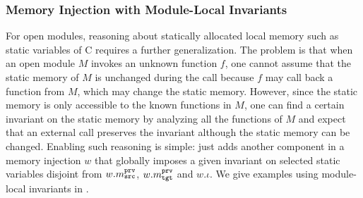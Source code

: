 {





\subsubsection{Memory Injection with Module-Local Invariants}
\label{sec:overview-verification:injection:static}
%
For open modules, reasoning about statically allocated local memory
such as static variables of C requires a further generalization.  The
problem is that when an open module $M$ invokes an unknown function
$f$, one cannot assume that the static memory of $M$ is unchanged
during the call because $f$ may call back a function from $M$, which
may change the static memory. However, since the static memory is only
accessible to the known functions in $M$, one can find a certain
invariant on the static memory by analyzing all the functions of $M$
and expect that an external call preserves the invariant although the
static memory can be changed. Enabling such reasoning is simple:
\ccm{} just adds another component in a memory injection $w$ that
globally imposes a given invariant on selected static variables
disjoint from $w.m^{\texttt{prv}}_{\texttt{src}}$, $w.m^{\texttt{prv}}_{\texttt{tgt}}$ and $w.\iota$.
We give examples using module-local invariants in .
} %

